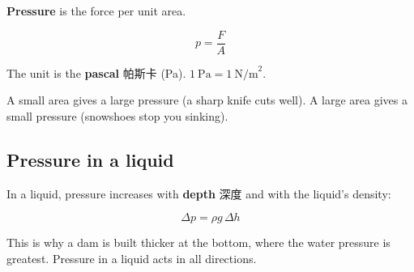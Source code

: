 \documentclass[11pt]{article}
\begin{document}
\textbf{Pressure} is the force per unit area.

\[
p = \frac{F}{A}
\]

The unit is the \textbf{pascal} 帕斯卡 (Pa). $1\ \text{Pa} = 1\ \text{N/m}^2$.

A small area gives a large pressure (a sharp knife cuts well). A large area gives a small pressure (snowshoes stop you sinking).

\subsection*{Pressure in a liquid}

In a liquid, pressure increases with \textbf{depth} 深度 and with the liquid's density:

\[
\Delta p = \rho g \,\Delta h
\]

This is why a dam is built thicker at the bottom, where the water pressure is greatest. Pressure in a liquid acts in all directions.
\end{document}
